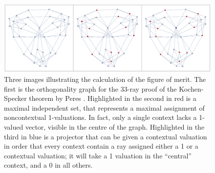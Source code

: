 \documentclass{amsart}
\theoremstyle{definition}
\begin{document}
\begin{figure}
\includegraphics[width=\textwidth]{33rayHighlights}
\caption{Three images illustrating the calculation of the figure of merit. The first is the orthogonality graph for the 33-ray proof of the Kochen-Specker theorem by Peres \cite{Pere1991}. Highlighted in the second in red is a maximal independent set, that represents a maximal assignment of noncontextual 1-valuations. In fact, only a single context lacks a 1-valued vector, visible in the centre of the graph. Highlighted in the third in blue is a projector that can be given a contextual valuation in order that every context contain a ray assigned either a 1 or a contextual valuation; it will take a 1 valuation in the ``central'' context, and a 0 in all others.}
\end{figure}
\end{document}
